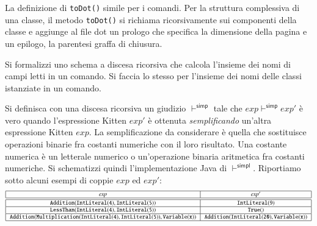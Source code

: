 La definizione di \texttt{toDot()} \e simile per i comandi. Per la
struttura complessiva di una classe, il metodo \texttt{toDot()}
si richiama ricorsivamente sui componenti della classe e aggiunge al file
dot un prologo che specifica la dimensione della pagina e un epilogo, \cioe
la parentesi graffa di chiusura.
%
%
\begin{exercise}\label{ex:descent_fields}
Si formalizzi uno schema a discesa ricorsiva che calcola l'insieme dei
nomi di campi letti in un comando. Si faccia lo stesso per l'insieme
dei nomi delle classi istanziate in un comando.
\end{exercise}
%
\begin{exercise}\label{ex:expressions_simplify}
Si definisca con una discesa ricorsiva un giudizio
$\vdash^{\mathsf{simp}}$ tale che
$\mathit{exp}\vdash^{\mathsf{simp}}\mathit{exp}'$ \`e vero quando
l'espressione Kitten $\mathit{exp}'$ \`e ottenuta \emph{semplificando}
un'altra espressione Kitten $\mathit{exp}$. La semplificazione da considerare
\`e quella che sostituisce operazioni binarie fra costanti numeriche
con il loro risultato. Una costante numerica \`e un letterale numerico
o un'operazione binaria aritmetica fra costanti numeriche.
Si schematizzi quindi l'implementazione Java di $\vdash^{\mathsf{simpl}}$.
Riportiamo sotto alcuni esempi di coppie $\mathit{exp}$ ed $\mathit{exp}'$:
%
\[
{\scriptsize
\begin{array}{|c|c|}\hline
  \mathit{exp} & \mathit{exp'}\\\hline\hline
  \mathtt{Addition(IntLiteral(4),IntLiteral(5))} & \mathtt{IntLiteral(9)} \\
    \hline
  \mathtt{LessThan(IntLiteral(4),IntLiteral(5))} & \mathtt{True()} \\\hline
  \mathtt{Addition(Multiplication(IntLiteral(4),IntLiteral(5)),
    Variable(x))} & \mathtt{Addition(IntLiteral(20),Variable(x))}\\\hline
\end{array}
}
\]
\end{exercise}
